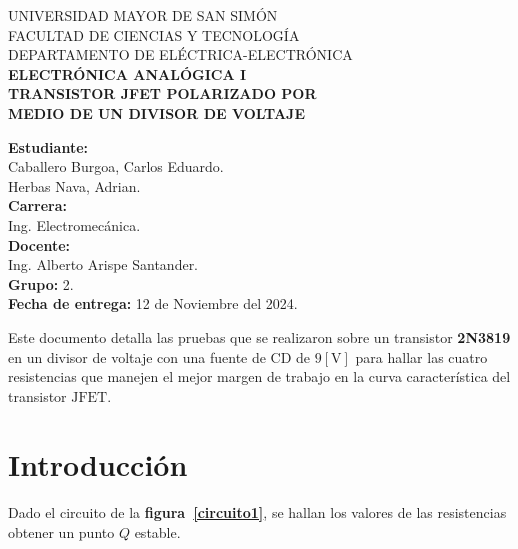 \documentclass[letter,twoside,11pt]{article}
\newcommand{\blankpage}{
\newpage
\thispagestyle{empty}
\mbox{}
\newpage
}
\begin{document}
\begin{titlepage}
    \begin{center}
        {\Large UNIVERSIDAD MAYOR DE SAN SIMÓN}\\
        \vspace*{0.15cm}
        {\large FACULTAD DE CIENCIAS Y TECNOLOGÍA}\\
        \vspace*{0.10cm}
        DEPARTAMENTO DE ELÉCTRICA-ELECTRÓNICA\\
        \vspace*{3.0cm}
        {\Large \textbf{ELECTRÓNICA ANALÓGICA I}}\\
        \vspace*{3.5cm}
        {\Large \textbf{TRANSISTOR JFET POLARIZADO POR \\
        MEDIO DE UN DIVISOR DE VOLTAJE}}\\
    \end{center}

    \vspace*{6.1cm}
    \leftskip=7.95cm
    \noindent
    \textbf{Estudiante:}\\
    Caballero Burgoa, Carlos Eduardo.\\
    Herbas Nava, Adrian.\\
    \newline
    \textbf{Carrera:}\\
    Ing. Electromecánica.\\
    \newline
    \textbf{Docente:}\\
    Ing. Alberto Arispe Santander.\\
    \newline
    \textbf{Grupo:} 2.\\
    \textbf{Fecha de entrega:} 12 de Noviembre del 2024.\\
\end{titlepage}
\addtocounter{page}{-1}

\blankpage
\addtocounter{page}{-1}

Este documento detalla las pruebas que se realizaron sobre un transistor
\textbf{2N3819} en un divisor de voltaje con una fuente de CD de
$9[\text{V}]$ para hallar las cuatro resistencias que manejen el mejor margen
de trabajo en la curva característica del transistor $\text{JFET}$.

\section{Introducción}
Dado el circuito de la \textbf{figura~\ref{circuito1}}, se hallan los valores de
las resistencias obtener un punto $Q$ estable.
\end{document}
